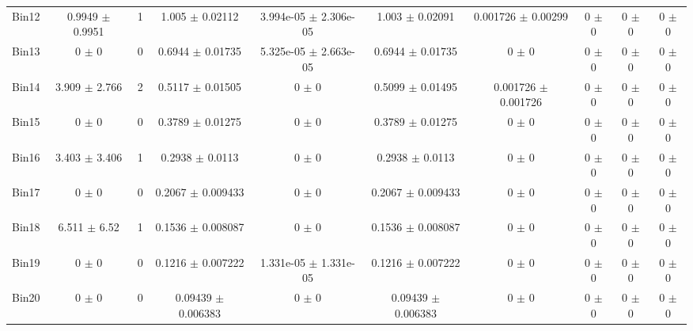\begin{tabular}{@{\extracolsep{4pt}}lccccccccc@{}}
     Bin12 & 0.9949 $\pm$ 0.9951 & 1 & 1.005 $\pm$ 0.02112 & 3.994e-05 $\pm$ 2.306e-05 & 1.003 $\pm$ 0.02091 & 0.001726 $\pm$ 0.00299 & 0 $\pm$ 0 & 0 $\pm$ 0 & 0 $\pm$ 0 \\ 
     Bin13 & 0 $\pm$ 0 & 0 & 0.6944 $\pm$ 0.01735 & 5.325e-05 $\pm$ 2.663e-05 & 0.6944 $\pm$ 0.01735 & 0 $\pm$ 0 & 0 $\pm$ 0 & 0 $\pm$ 0 & 0 $\pm$ 0 \\ 
     Bin14 & 3.909 $\pm$ 2.766 & 2 & 0.5117 $\pm$ 0.01505 & 0 $\pm$ 0 & 0.5099 $\pm$ 0.01495 & 0.001726 $\pm$ 0.001726 & 0 $\pm$ 0 & 0 $\pm$ 0 & 0 $\pm$ 0 \\ 
     Bin15 & 0 $\pm$ 0 & 0 & 0.3789 $\pm$ 0.01275 & 0 $\pm$ 0 & 0.3789 $\pm$ 0.01275 & 0 $\pm$ 0 & 0 $\pm$ 0 & 0 $\pm$ 0 & 0 $\pm$ 0 \\ 
     Bin16 & 3.403 $\pm$ 3.406 & 1 & 0.2938 $\pm$ 0.0113 & 0 $\pm$ 0 & 0.2938 $\pm$ 0.0113 & 0 $\pm$ 0 & 0 $\pm$ 0 & 0 $\pm$ 0 & 0 $\pm$ 0 \\ 
     Bin17 & 0 $\pm$ 0 & 0 & 0.2067 $\pm$ 0.009433 & 0 $\pm$ 0 & 0.2067 $\pm$ 0.009433 & 0 $\pm$ 0 & 0 $\pm$ 0 & 0 $\pm$ 0 & 0 $\pm$ 0 \\ 
     Bin18 & 6.511 $\pm$ 6.52 & 1 & 0.1536 $\pm$ 0.008087 & 0 $\pm$ 0 & 0.1536 $\pm$ 0.008087 & 0 $\pm$ 0 & 0 $\pm$ 0 & 0 $\pm$ 0 & 0 $\pm$ 0 \\ 
     Bin19 & 0 $\pm$ 0 & 0 & 0.1216 $\pm$ 0.007222 & 1.331e-05 $\pm$ 1.331e-05 & 0.1216 $\pm$ 0.007222 & 0 $\pm$ 0 & 0 $\pm$ 0 & 0 $\pm$ 0 & 0 $\pm$ 0 \\ 
     Bin20 & 0 $\pm$ 0 & 0 & 0.09439 $\pm$ 0.006383 & 0 $\pm$ 0 & 0.09439 $\pm$ 0.006383 & 0 $\pm$ 0 & 0 $\pm$ 0 & 0 $\pm$ 0 & 0 $\pm$ 0 \\ 
\hline\hline
  \end{tabular}
